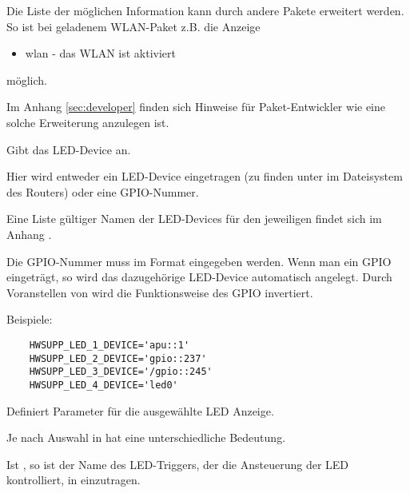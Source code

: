 \begin{description}

  Die Liste der möglichen Information kann durch andere Pakete erweitert werden.
  So ist bei geladenem WLAN-Paket z.B. die Anzeige 
  \begin{itemize}
    \item wlan - das WLAN ist aktiviert
  \end{itemize}
  möglich.

  Im Anhang \ref{sec:developer} finden sich Hinweise für
  Paket-Entwickler wie eine solche Erweiterung anzulegen ist. 

  Gibt das LED-Device an.
  
  Hier wird entweder ein LED-Device eingetragen (zu finden unter 
  im Dateisystem des Routers) oder eine GPIO\footnotemark-Nummer. 


  Eine Liste gültiger Namen der LED-Devices für den jeweiligen 
  findet sich im Anhang .
  
  Die GPIO-Nummer muss im Format  eingegeben werden.
  Wenn man ein GPIO eingeträgt, so wird das dazugehörige LED-Device
  automatisch angelegt. Durch Voranstellen von \var{/} wird die
  Funktionsweise des GPIO invertiert.
  
  Beispiele:
  \begin{verbatim}
    HWSUPP_LED_1_DEVICE='apu::1'
    HWSUPP_LED_2_DEVICE='gpio::237'
    HWSUPP_LED_3_DEVICE='/gpio::245'
    HWSUPP_LED_4_DEVICE='led0'
  \end{verbatim}

  Definiert Parameter für die ausgewählte LED Anzeige.
  
  Je nach Auswahl in  hat  
  eine unterschiedliche Bedeutung.  

  Ist , so ist der Name des LED-Triggers, 
  der die Ansteuerung der LED kontrolliert, in 
  einzutragen.


\end{description}
